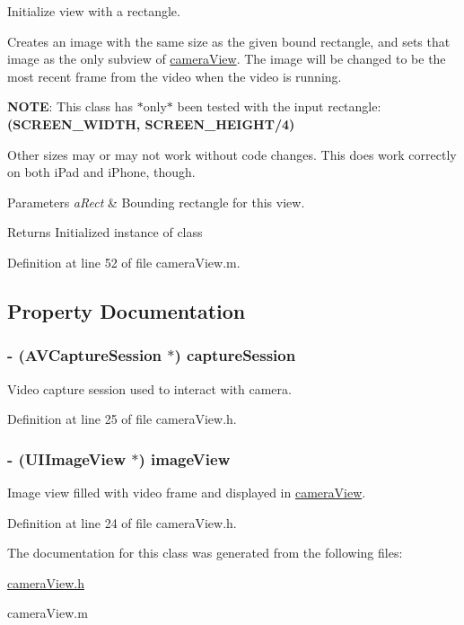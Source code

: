 Initialize view with a rectangle. 

Creates an image with the same size as the given bound rectangle, and sets that image as the only subview of \hyperlink{interfacecamera_view}{cameraView}. The image will be changed to be the most recent frame from the video when the video is running.

{\bfseries NOTE}: This class has $\ast$only$\ast$ been tested with the input rectangle: {\bfseries (SCREEN\_\-WIDTH, SCREEN\_\-HEIGHT/4)}

Other sizes may or may not work without code changes. This does work correctly on both iPad and iPhone, though.


\begin{DoxyParams}{Parameters}
{\em aRect} & Bounding rectangle for this view. \\
\hline
\end{DoxyParams}
\begin{DoxyReturn}{Returns}
Initialized instance of class 
\end{DoxyReturn}


Definition at line 52 of file cameraView.m.



\subsection{Property Documentation}
\hypertarget{interfacecamera_view_a6325249b12975d12ea28b956b46fae62}{
\subsubsection[{captureSession}]{\setlength{\rightskip}{0pt plus 5cm}-\/ (AVCaptureSession $\ast$) captureSession}}
\label{interfacecamera_view_a6325249b12975d12ea28b956b46fae62}
Video capture session used to interact with camera. 

Definition at line 25 of file cameraView.h.

\hypertarget{interfacecamera_view_a636153a51fbba10a8c14fb52b1f184a6}{
\subsubsection[{imageView}]{\setlength{\rightskip}{0pt plus 5cm}-\/ (UIImageView $\ast$) imageView}}
\label{interfacecamera_view_a636153a51fbba10a8c14fb52b1f184a6}
Image view filled with video frame and displayed in \hyperlink{interfacecamera_view}{cameraView}. 

Definition at line 24 of file cameraView.h.



The documentation for this class was generated from the following files:\begin{DoxyCompactItemize}
\item 
\hyperlink{camera_view_8h}{cameraView.h}\item 
cameraView.m\end{DoxyCompactItemize}
